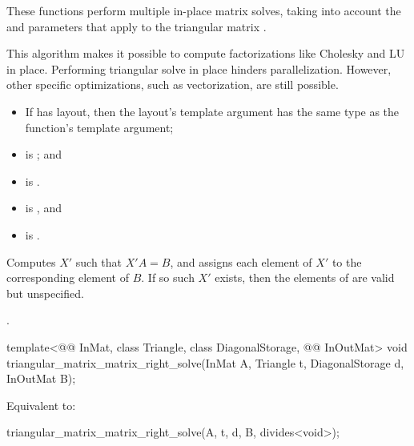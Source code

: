 \begin{itemdescr}
\pnum
These functions perform multiple in-place matrix solves,
taking into account the  and  parameters
that apply to the triangular matrix .
\begin{note}
This algorithm makes it possible
to compute factorizations like Cholesky and LU in place.
Performing triangular solve in place hinders parallelization.
However, other  specific optimizations,
such as vectorization, are still possible.
\end{note}

\pnum
\mandates
\begin{itemize}
\item
If  has  layout,
then the layout's  template argument has
the same type as the function's  template argument;
\item
{}
is ; and
\item
{} is .
\end{itemize}

\pnum
\expects
\begin{itemize}
\item
{} is , and
\item
{} is .
\end{itemize}

\pnum
\effects
Computes $X'$ such that $X'A = B$,
and assigns each element of $X'$ to the corresponding element of $B$.
If so such $X'$ exists,
then the elements of  are valid but unspecified.

\pnum
\complexity
{}.
\end{itemdescr}

%
\begin{itemdecl}
template<@@ InMat, class Triangle, class DiagonalStorage, @@ InOutMat>
  void triangular_matrix_matrix_right_solve(InMat A, Triangle t, DiagonalStorage d, InOutMat B);
\end{itemdecl}

\begin{itemdescr}
\pnum
\effects
Equivalent to:
\begin{codeblock}
triangular_matrix_matrix_right_solve(A, t, d, B, divides<void>{});
\end{codeblock}
\end{itemdescr}

